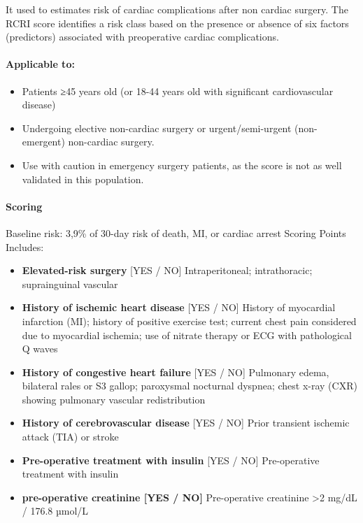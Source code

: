 \documentclass[
  letterpaper,
  DIV=11,
  numbers=noendperiod]{scrreprt}
\let\oldparagraph\paragraph
\renewcommand{\paragraph}[1]{\oldparagraph{#1}\mbox{}}
\providecommand{\tightlist}{%
  \setlength{\itemsep}{0pt}\setlength{\parskip}{0pt}}\usepackage{longtable,booktabs,array}
\begin{document}
It used to estimates risk of cardiac complications after non cardiac
surgery. The RCRI score identifies a risk class based on the presence or
absence of six factors (predictors) associated with preoperative cardiac
complications.

\paragraph{Applicable to:}\label{applicable-to-1}

\begin{itemize}
\tightlist
\item
  Patients ≥45 years old (or 18-44 years old with significant
  cardiovascular disease)
\item
  Undergoing elective non-cardiac surgery or urgent/semi-urgent
  (non-emergent) non-cardiac surgery.
\item
  Use with caution in emergency surgery patients, as the score is not as
  well validated in this population.
\end{itemize}

\paragraph{Scoring}\label{scoring-1}

Baseline risk: 3,9\% of 30-day risk of death, MI, or cardiac arrest
Scoring Points Includes:

\begin{itemize}
\tightlist
\item
  \textbf{Elevated-risk surgery} {[}YES / NO{]} Intraperitoneal;
  intrathoracic; suprainguinal vascular
\item
  \textbf{History of ischemic heart disease} {[}YES / NO{]} History of
  myocardial infarction (MI); history of positive exercise test; current
  chest pain considered due to myocardial ischemia; use of nitrate
  therapy or ECG with pathological Q waves
\item
  \textbf{History of congestive heart failure} {[}YES / NO{]} Pulmonary
  edema, bilateral rales or S3 gallop; paroxysmal nocturnal dyspnea;
  chest x-ray (CXR) showing pulmonary vascular redistribution
\item
  \textbf{History of cerebrovascular disease} {[}YES / NO{]} Prior
  transient ischemic attack (TIA) or stroke
\item
  \textbf{Pre-operative treatment with insulin} {[}YES / NO{]}
  Pre-operative treatment with insulin
\item
  \textbf{pre-operative creatinine {[}YES / NO{]}} Pre-operative
  creatinine \textgreater2 mg/dL / 176.8 µmol/L
\end{itemize}
\end{document}
